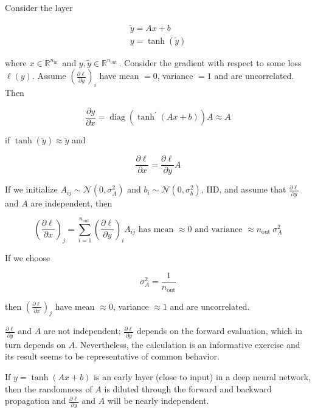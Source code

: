 \documentclass{report}
\begin{document}
\begin{definition}
    Consider the layer

    $$
    \begin{gathered}
    \tilde{y}=A x+b \\
    y=\tanh (\tilde{y})
    \end{gathered}
    $$

    where $x \in \mathbb{R}^{n_{\text {in }}}$ and $y, \tilde{y} \in \mathbb{R}^{n_{\text {out }}}$. Consider the gradient with respect to some loss $\ell(y)$. Assume $\left(\frac{\partial \ell}{\partial y}\right)_{i}$ have mean $=0$, variance $=1$ and are uncorrelated. Then

    $$
    \frac{\partial y}{\partial x}=\operatorname{diag}\left(\tanh ^{\prime}(A x+b)\right) A \approx A
    $$

    if $\tanh (\tilde{y}) \approx \tilde{y}$ and

    $$
    \frac{\partial \ell}{\partial x}=\frac{\partial \ell}{\partial y} A
    $$

    If we initialize $A_{i j} \sim \mathcal{N}\left(0, \sigma_{A}^{2}\right)$ and $b_{i} \sim \mathcal{N}\left(0, \sigma_{b}^{2}\right)$, IID, and assume that $\frac{\partial \ell}{\partial y}$ and $A$ are independent, then

    $$
    \left(\frac{\partial \ell}{\partial x}\right)_{j}=\sum_{i=1}^{n_{\text {out }}}\left(\frac{\partial \ell}{\partial y}\right)_{i} A_{i j} \text { has mean } \approx 0 \text { and variance } \approx n_{\text {out }} \sigma_{A}^{2}
    $$

    If we choose

    $$
    \sigma_{A}^{2}=\frac{1}{n_{\mathrm{out}}}
    $$

    then $\left(\frac{\partial \ell}{\partial x}\right)_{j}$ have mean $\approx 0$, variance $\approx 1$ and are uncorrelated.

    \par\noindent\textcolor{gray}{\hdashrule{\textwidth}{0.4pt}{1pt 2pt}}

    $\frac{\partial \ell}{\partial y}$ and $A$ are not independent; $\frac{\partial \ell}{\partial y}$ depends on the forward evaluation, which in turn depends on $A$. Nevertheless, the calculation is an informative exercise and its result seems to be representative of common behavior.

    If $y=\tanh (A x+b)$ is an early layer (close to input) in a deep neural network, then the randomness of $A$ is diluted through the forward and backward propagation and $\frac{\partial \ell}{\partial y}$ and $A$ will be nearly independent.


\end{definition}
\end{document}
